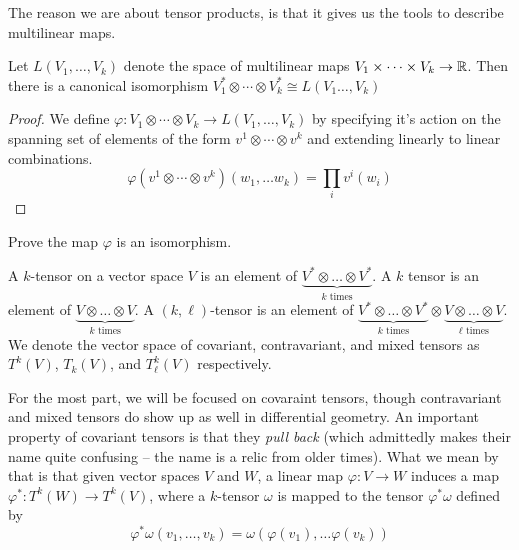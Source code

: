 %
The reason we are about tensor products, is that it gives us the tools to
describe multilinear maps.
%
\begin{thm}
Let $L(V_1, \ldots, V_k)$ denote the space of multilinear maps
$V_1 \times \cdots \times V_k \to \mathbb{R}$. Then there is a canonical isomorphism
$V_1^* \otimes \cdots \otimes V_k^* \cong L(V_1 \ldots, V_k)$
\end{thm}
%
\begin{proof}
We define $\varphi : V_1 \otimes \cdots \otimes V_k \to L(V_1, \ldots, V_k)$ by
specifying it's action on the spanning set of elements of the form
$v^1 \otimes \cdots \otimes v^k$ and extending linearly to linear combinations.
$$\varphi(v^1 \otimes \cdots \otimes v^k)(w_1, \ldots w_k) =
\prod_i v^i(w_i)$$
\end{proof}
%
\begin{exer}
Prove the map $\varphi$ is an isomorphism.
\end{exer}
%
\begin{defn}
A  $k$-tensor on a vector space $V$ is an element of
$\underbrace{V^* \otimes \ldots \otimes V^*}_{k \text{ times}}$. A
 $k$ tensor is an element of $\underbrace{V \otimes \ldots \otimes V}_{k \text{ times}}$. A $(k,\ell)$-tensor is an element of
$\underbrace{V^* \otimes \ldots \otimes V^*}_{k \text{ times}} \otimes
\underbrace{V \otimes \ldots \otimes V}_{\ell \text{ times}}$. We denote the
vector space of covariant, contravariant, and mixed tensors as $T^k(V)$,
$T_k(V)$, and $T^k_\ell(V)$ respectively.
\end{defn}
%
For the most part, we will be focused on covaraint tensors, though
contravariant and mixed tensors do show up as well in differential geometry.
An important property of covariant tensors is that they \emph{pull back}
(which admittedly makes their name quite confusing -- the name is a relic
from older times). What we mean by that is that given vector spaces $V$ and
$W$, a linear map $\varphi : V \to W$ induces a map
$\varphi^* : T^k(W) \to T^k(V)$, where a $k$-tensor $\omega$ is mapped
to the tensor $\varphi^*\omega$ defined by
$$\varphi^*\omega(v_1, \ldots, v_k) = \omega(\varphi(v_1), \ldots \varphi(v_k))$$
%
